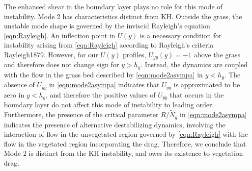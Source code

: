 \documentclass[12pt]{report}   %
\newcommand{\hg}{h_g}
\newcommand{\Rey}{{R}}
\newcommand{\Ndg}{\tilde{N}_g}
\begin{document}
The enhanced shear in the boundary layer plays no role for this mode of instability.
Mode 2 has characteristics distinct from KH. Outside the grass, the unstable mode shape is governed by the inviscid Rayleigh's equation \eqref{eqn:Rayleigh}.
An inflection point in $U(y)$ is a necessary condition for instability arising from \eqref{eqn:Rayleigh} according to Rayleigh's criteria {Rayleigh1879}. 
However, for our $U(y)$ profiles, $U_{yy}(y) = -1$ above the grass and therefore does not change sign for $y>\hg$. 
Instead, the dynamics are coupled with the flow in the grass bed described by \eqref{eqn:mode2asympa} in $y< \hg$.
The absence of $U_{yy}$ in \eqref{eqn:mode2asympa} indicates that $U_{yy}$ is approximated to be zero in $y<\hg$, and therefore the positive values of $U_{yy}$ that occurs in the boundary layer do not affect this mode of instability to leading order.
Furthermore, the presence of the critical parameter $\Rey/\Ndg$ in \eqref{eqn:mode2asympa} indicates the presence of alternative destabilizing dynamics, involving the interaction of flow in the unvegetated region governed by \eqref{eqn:Rayleigh} with the flow in the vegetated region incorporating the drag.
Therefore, we conclude that Mode 2 is distinct from the KH instability, and owes its existence to vegetation drag.
\end{document}
